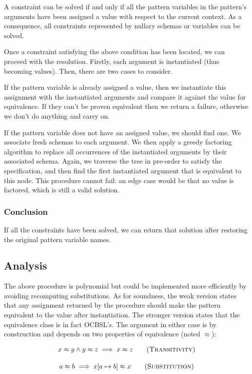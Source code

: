 A constraint can be solved if and only if all the pattern variables in the pattern's arguments have been assigned a value with respect to the current context. As a consequence, all constraints represented by nullary schemas or variables can be solved.

Once a constraint satisfying the above condition has been located, we can proceed with the resolution. Firstly, each argument is instantiated (thus becoming values). Then, there are two cases to consider.

If the pattern variable is already assigned a value, then we instantiate this assignment with the instantiated arguments and compare it against the value for equivalence. If they can't be proven equivalent then we return a failure, otherwise we don't do anything and carry on.

If the pattern variable does not have an assigned value, we should find one. We associate fresh schemas to each argument. We then apply a greedy factoring algorithm to replace all occurrences of the instantiated arguments by their associated schema. Again, we traverse the tree in pre-order to satisfy the specification, and then find the first instantiated argument that is equivalent to this node. This procedure cannot fail: an edge case would be that no value is factored, which is still a valid solution.

\subsubsection{Conclusion}

If all the constraints have been solved, we can return that solution after restoring the original pattern variable names.

\subsection{Analysis}

The above procedure is polynomial but could be implemented more efficiently by avoiding recomputing substitutions. As for soundness, the weak version states that any assignment returned by the procedure should make the pattern equivalent to the value after instantiation. The stronger version states that the equivalence class is in fact OCBSL's. The argument in either case is by construction and depends on two properties of equivalence (noted $\approx$):

\begin{gather}
  {x \approx y \land y \approx z} \implies {x \approx z} \tag{\textsc{Transitivity}} \\[1em]
  {a \approx b} \implies {x[a \mapsto b] \approx x} \tag{\textsc{Substitution}}
\end{gather}

